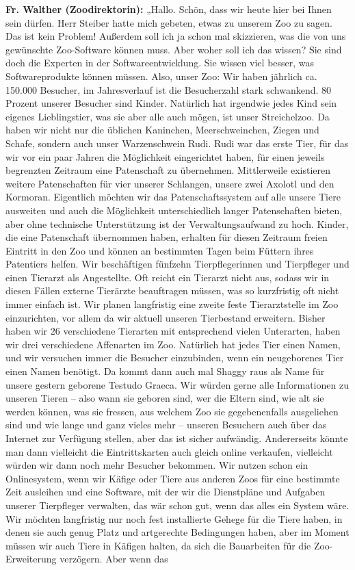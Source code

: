 
\textbf{Fr. Walther (Zoodirektorin):} „Hallo. Schön, dass wir heute hier bei Ihnen sein dürfen. Herr Steiber hatte mich gebeten, etwas zu unserem Zoo zu sagen. Das ist kein Problem! Außerdem soll ich ja schon mal skizzieren, was die von uns gewünschte Zoo-Software können muss. Aber woher soll ich das wissen? Sie sind doch die Experten in der Softwareentwicklung. Sie wissen viel besser, was Softwareprodukte können müssen. Also, unser Zoo: Wir haben jährlich ca. 150.000 Besucher, im Jahresverlauf ist die Besucherzahl stark schwankend. 80 Prozent unserer Besucher sind Kinder. Natürlich hat irgendwie jedes Kind sein eigenes Lieblingstier, was sie aber alle auch mögen, ist unser Streichelzoo. Da haben wir nicht nur die üblichen Kaninchen, Meerschweinchen, Ziegen und Schafe, sondern auch unser Warzenschwein Rudi. Rudi war das erste Tier, für das wir vor ein paar Jahren die Möglichkeit eingerichtet haben, für einen jeweils begrenzten Zeitraum eine Patenschaft zu übernehmen. Mittlerweile existieren weitere Patenschaften für vier unserer Schlangen, unsere zwei Axolotl und den Kormoran. Eigentlich möchten wir das Patenschaftssystem auf alle unsere Tiere ausweiten und auch die Möglichkeit unterschiedlich langer Patenschaften bieten, aber ohne technische Unterstützung ist der Verwaltungsaufwand zu hoch. Kinder, die eine Patenschaft übernommen haben, erhalten für diesen Zeitraum freien Eintritt in den Zoo und können an bestimmten Tagen beim Füttern ihres Patentiers helfen. Wir beschäftigen fünfzehn Tierpflegerinnen und Tierpfleger und einen Tierarzt als Angestellte. Oft reicht ein Tierarzt nicht aus, sodass wir in diesen Fällen externe Tierärzte beauftragen müssen, was so kurzfristig oft nicht immer einfach ist. Wir planen langfristig eine zweite feste Tierarztstelle im Zoo einzurichten, vor allem da wir aktuell unseren Tierbestand erweitern. Bisher haben wir 26 verschiedene Tierarten mit entsprechend vielen Unterarten, \zb haben wir drei verschiedene Affenarten im Zoo. Natürlich hat jedes Tier einen Namen, und wir versuchen immer die Besucher einzubinden, wenn ein neugeborenes Tier einen Namen benötigt. Da kommt dann auch mal Shaggy raus als Name für unsere gestern geborene Testudo Graeca. Wir würden gerne alle Informationen zu unseren Tieren – also wann sie geboren sind, wer die Eltern sind, wie alt sie werden können, was sie fressen, aus welchem Zoo sie gegebenenfalls ausgeliehen sind und wie lange und ganz vieles mehr – unseren Besuchern auch über das Internet zur Verfügung stellen, aber das ist sicher aufwändig. Andererseits könnte man dann vielleicht die Eintrittskarten auch gleich online verkaufen, vielleicht würden wir dann noch mehr Besucher bekommen. Wir nutzen schon ein Onlinesystem, wenn wir Käfige oder Tiere aus anderen Zoos für eine bestimmte Zeit ausleihen und eine Software, mit der wir die Dienstpläne und Aufgaben unserer Tierpfleger verwalten, das wär schon gut, wenn das alles ein System wäre. Wir möchten langfristig nur noch fest installierte Gehege für die Tiere haben, in denen sie auch genug Platz und artgerechte Bedingungen haben, aber im Moment müssen wir auch Tiere in Käfigen halten, da sich die Bauarbeiten für die Zoo-Erweiterung verzögern. Aber wenn das 